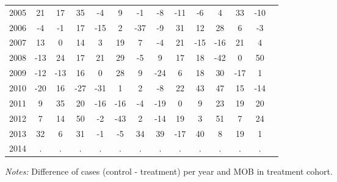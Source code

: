 \begin{table}[H]
\begin{threeparttable}
{\begin{tabular}{l*{13}{c}}
2005        &          21&          17&          35&          -4&           9&          -1&          -8&         -11&          -6&           4&          33&         -10\\
2006        &          -4&          -1&          17&         -15&           2&         -37&          -9&          31&          12&          28&           6&          -3\\
2007        &          13&           0&          14&           3&          19&           7&          -4&          21&         -15&         -16&          21&           4\\
2008        &         -13&          24&          17&          21&          29&          -5&           9&          17&          18&         -42&           0&          50\\
2009        &         -12&         -13&          16&           0&          28&           9&         -24&           6&          18&          30&         -17&           1\\
2010        &         -20&          16&         -27&         -31&           1&           2&          -8&          22&          43&          47&          15&         -14\\
2011        &           9&          35&          20&         -16&         -16&          -4&         -19&           0&           9&          23&          19&          20\\
2012        &           7&          14&          50&          -2&         -43&           2&         -14&          19&           3&          51&           7&          24\\
2013        &          32&           6&          31&          -1&          -5&          34&          39&         -17&          40&           8&          19&           1\\
2014        &           .&           .&           .&           .&           .&           .&           .&           .&           .&           .&           .&           .\\
 \bottomrule \end{tabular} } \begin{tablenotes} \item \scriptsize \emph{Notes:} Difference of cases (control - treatment) per year and MOB in treatment cohort. \end{tablenotes} \end{threeparttable} \end{table} 
